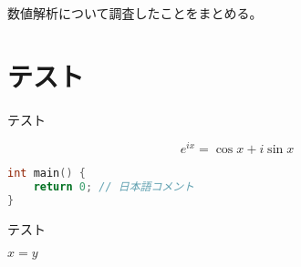 \documentclass[a4j,dvipdfmx,
]{jsarticle}
\begin{document}
\maketitle
\pagestyle{kentaf}

\vskip20pt

数値解析について調査したことをまとめる。

\vskip20pt

\setcounter{tocdepth}{1}
\tableofcontents

\clearpage

\pagestyle{kenta}

\section{テスト}

テスト

\begin{equation}
    e^{ix} = \cos{x} + i \sin{x}
\end{equation}

\begin{lstlisting}[caption=テスト, language={C++}]
int main() {
    return 0; // 日本語コメント
}
\end{lstlisting}

\begin{algorithm}
    \caption{テスト}
    \begin{algorithmic}
        \State $x = y$
        \EndProcedure
    \end{algorithmic}
\end{algorithm}

\cite{Hirayama2014}



\end{document}
